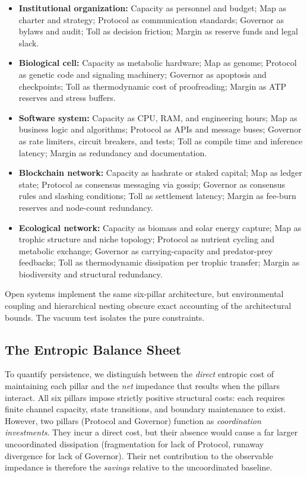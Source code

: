 \begin{itemize}
    \item \textbf{Institutional organization:} Capacity as personnel and budget; Map as charter and strategy; Protocol as communication standards; Governor as bylaws and audit; Toll as decision friction; Margin as reserve funds and legal slack.
    \item \textbf{Biological cell:} Capacity as metabolic hardware; Map as genome; Protocol as genetic code and signaling machinery; Governor as apoptosis and checkpoints; Toll as thermodynamic cost of proofreading; Margin as ATP reserves and stress buffers.
    \item \textbf{Software system:} Capacity as CPU, RAM, and engineering hours; Map as business logic and algorithms; Protocol as APIs and message buses; Governor as rate limiters, circuit breakers, and tests; Toll as compile time and inference latency; Margin as redundancy and documentation.
    \item \textbf{Blockchain network:} Capacity as hashrate or staked capital; Map as ledger state; Protocol as consensus messaging via gossip; Governor as consensus rules and slashing conditions; Toll as settlement latency; Margin as fee-burn reserves and node-count redundancy.
    \item \textbf{Ecological network:} Capacity as biomass and solar energy capture; Map as trophic structure and niche topology; Protocol as nutrient cycling and metabolic exchange; Governor as carrying-capacity and predator-prey feedbacks; Toll as thermodynamic dissipation per trophic transfer; Margin as biodiversity and structural redundancy.
\end{itemize}

Open systems implement the same six-pillar architecture, but environmental coupling and hierarchical nesting obscure exact accounting of the architectural bounds. The vacuum test isolates the pure constraints.


\subsection{The Entropic Balance Sheet}
\label{subsec:entropic_balance_sheet}
To quantify persistence, we distinguish between the \emph{direct} entropic cost of maintaining each pillar and the \emph{net} impedance that results when the pillars interact. All six pillars impose strictly positive structural costs: each requires finite channel capacity, state transitions, and boundary maintenance to exist. However, two pillars (Protocol and Governor) function as \emph{coordination investments}. They incur a direct cost, but their absence would cause a far larger uncoordinated dissipation (fragmentation for lack of Protocol, runaway divergence for lack of Governor). Their net contribution to the observable impedance is therefore the \emph{savings} relative to the uncoordinated baseline.

